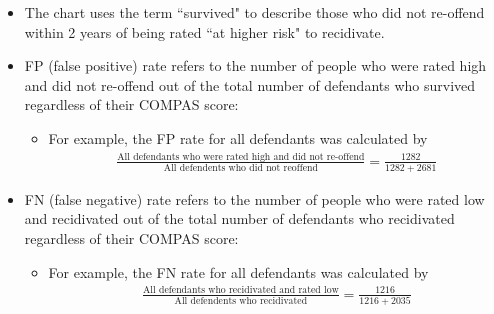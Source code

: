 \documentclass[12pt]{article}
\begin{document}
\begin{itemize}
\item The chart uses the term ``survived" to describe those who did not re-offend within 2 years of being rated ``at higher risk" to recidivate.
\item FP (false positive) rate refers to the number of people who were rated high and did not re-offend out of the total number of defendants who survived regardless of their COMPAS score:
	\begin{itemize}
	\item For example, the FP rate for all defendants was calculated by 
		\begin{eqnarray*} \frac{\mbox{All defendants who were rated high and did not re-offend}}{\mbox{All defendents who did not reoffend}} = \frac{1282}{1282+2681} \end{eqnarray*}
	\end{itemize}
\item FN (false negative) rate refers to the number of people who were rated low and recidivated out of the total number of defendants who recidivated regardless of their COMPAS score:
	\begin{itemize}
	\item For example, the FN rate for all defendants was calculated by
		\begin{eqnarray*} \frac{\mbox{All defendants who recidivated and rated low}}{\mbox{All defendents who recidivated}} = \frac{1216}{1216+2035} \end{eqnarray*}
	\end{itemize}

\end{itemize}
\end{document}
